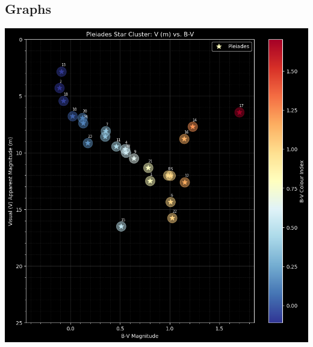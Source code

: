 \documentclass[12pt]{article}
\begin{document}
\subsection*{Graphs}

\begin{minipage}{.49\textwidth}
    \captionsetup{hypcap=false}
    \centering
    \includegraphics[width=\linewidth]{pleiades graoh.png}
    \label{fig:pleigraph}
\end{minipage}
\hfill
\end{document}
